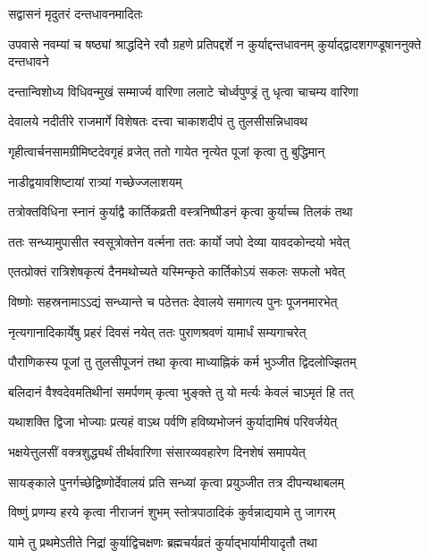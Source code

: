 \onelineshloka
{सद्वासनं मृदुतरं दन्तधावनमादितः} %

\threelineshloka
{उपवासे नवम्यां च षष्ठ्यां श्राद्धदिने रवौ}
{ग्रहणे प्रतिपद्दर्शे न कुर्याद्दन्तधावनम्}
{कुर्याद्द्वादशगण्डूषाननुक्ते दन्तधावने} %

\twolineshloka
{दन्तान्विशोध्य विधिवन्मुखं सम्मार्ज्य वारिणा}
{ललाटे चोर्ध्वपुण्ड्रं तु धृत्वा चाचम्य वारिणा} %

\twolineshloka
{देवालये नदीतीरे राजमार्गे विशेषतः}
{दत्त्वा चाकाशदीपं तु तुलसीसन्निधावथ} %

\twolineshloka
{गृहीत्वार्चनसामग्रीमिष्टदेवगृहं व्रजेत्}
{ततो गायेत नृत्येत पूजां कृत्वा तु बुद्धिमान्} %



\onelineshloka
{नाडीद्वयावशिष्टायां रात्र्यां गच्छेज्जलाशयम्} %

\twolineshloka
{तत्रोक्तविधिना स्नानं कुर्याद्वै कार्तिकव्रती}
{वस्त्रनिष्पीडनं कृत्वा कुर्याच्च तिलकं तथा} %

\twolineshloka
{ततः सन्ध्यामुपासीत स्वसूत्रोक्तेन वर्त्मना}
{ततः कार्यो जपो देव्या यावदकोन्दयो भवेत्} %

\twolineshloka
{एतत्प्रोक्तं रात्रिशेषकृत्यं दैनमथोच्यते}
{यस्मिन्कृते कार्तिकोऽयं सकलः सफलो भवेत्} %

\twolineshloka
{विष्णोः सहस्रनामाऽऽद्यं सन्ध्यान्ते च पठेत्ततः}
{देवालये समागत्य पुनः पूजनमारभेत्} %

\twolineshloka
{नृत्यगानादिकार्येषु प्रहरं दिवसं नयेत्}
{ततः पुराणश्रवणं यामार्धं सम्यगाचरेत्} %

\twolineshloka
{पौराणिकस्य पूजां तु तुलसीपूजनं तथा}
{कृत्वा माध्याह्निकं कर्म भुञ्जीत द्विदलोज्झितम्} %

\twolineshloka
{बलिदानं वैश्वदेवमतिथीनां समर्पणम्}
{कृत्वा भुङ्क्ते तु यो मर्त्यः केवलं चाऽमृतं हि तत्} %

\twolineshloka
{यथाशक्ति द्विजा भोज्याः प्रत्यहं वाऽथ पर्वणि}
{हविष्यभोजनं कुर्यादामिषं परिवर्जयेत्} %

\twolineshloka
{भक्षयेत्तुलसीं वक्त्रशुद्ध्यर्थं तीर्थवारिणा}
{संसारव्यवहारेण दिनशेषं समापयेत्} %

\twolineshloka
{सायङ्काले पुनर्गच्छेद्विष्णोर्देवालयं प्रति}
{सन्ध्यां कृत्वा प्रयुञ्जीत तत्र दीपन्यथाबलम्} %

\twolineshloka
{विष्णुं प्रणम्य हरये कृत्वा नीराजनं शुभम्}
{स्तोत्रपाठादिकं कुर्वन्नाद्ययामे तु जागरम्} %

\twolineshloka
{यामे तु प्रथमेऽतीते निद्रां कुर्याद्विचक्षणः}
{ब्रह्मचर्यव्रतं कुर्याद्भार्यामीयादृतौ तथा} %

